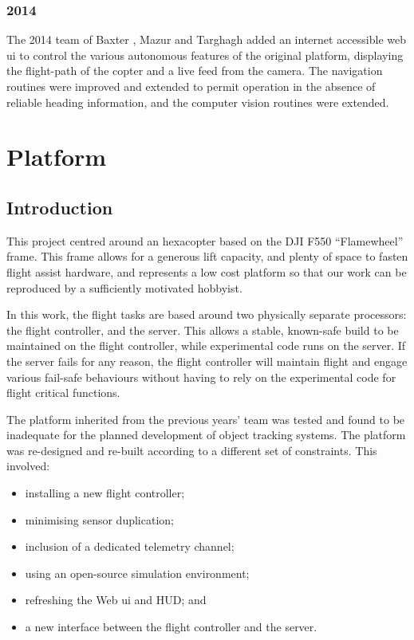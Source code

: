 \documentclass[a4paper, 11pt, titlepage]{article}
\begin{document}
      \subsubsection{2014}

        The 2014 team of Baxter \cite{Baxter}, Mazur \cite{Mazur} and Targhagh \cite{Targhagh} added an internet accessible web \gls{ui} to control the various autonomous features of the original platform, displaying the flight-path of the copter and a live feed from the camera.
        The navigation routines were improved and extended to permit operation in the absence of reliable heading information, and the computer vision routines were extended.

  \section{Platform}
    \subsection{Introduction}
      This project centred around an hexacopter based on the DJI F550 ``Flamewheel'' frame. This frame allows for a generous lift capacity, and plenty of space to fasten flight assist hardware, and represents a low cost platform so that our work can be reproduced by a sufficiently motivated hobbyist.

      In this work, the flight tasks are based around two physically separate processors: the flight controller, and the server. This allows a stable, known-safe build to be maintained on the flight controller, while experimental code runs on the server. If the server fails for any reason, the flight controller will maintain flight and engage various fail-safe behaviours without having to rely on the experimental code for flight critical functions.

      The platform inherited from the previous years' team was tested and found to be inadequate for the planned development of object tracking systems.  The platform was re-designed and re-built according to a different set of constraints.  This involved:

      \begin{itemize}
        \item installing a new flight controller;
        \item minimising sensor duplication;
        \item inclusion of a dedicated telemetry channel;
        \item using an open-source simulation environment;
        \item refreshing the Web \gls{ui} and HUD; and
        \item a new interface between the flight controller and the server.
      \end{itemize}
\end{document}
